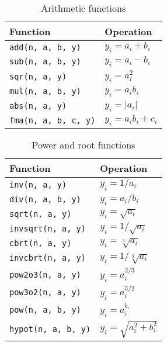 \begin{table}
  \begin{tabularx}{\textwidth}{LL}
    \toprule
    Function & Operation \\
    \midrule
    \verb|add(n, a, b, y)|    & $y_i = a_i + b_i$     \\
    \verb|sub(n, a, b, y)|    & $y_i = a_i - b_i$     \\
    \verb|sqr(n, a, y)|       & $y_i = a_i^2$         \\
    \verb|mul(n, a, b, y)|    & $y_i = a_i b_i$       \\
    \verb|abs(n, a, y)|       & $y_i = |a_i|$         \\
    \verb|fma(n, a, b, c, y)| & $y_i = a_i b_i + c_i$ \\
    \bottomrule
  \end{tabularx}
  \caption{Arithmetic functions}
  \label{tab:Arithmetic functions}
\end{table}

\begin{table}
  \begin{tabularx}{\textwidth}{LL}
    \toprule
    Function & Operation \\
    \midrule
    \verb|inv(n, a, y)|      & $y_i = 1 / a_i$              \\
    \verb|div(n, a, b, y)|   & $y_i = a_i / b_i$            \\
    \verb|sqrt(n, a, y)|     & $y_i = \sqrt{a_i}$           \\
    \verb|invsqrt(n, a, y)|  & $y_i = 1 / \sqrt{a_i}$       \\
    \verb|cbrt(n, a, y)|     & $y_i = \sqrt[3]{a_i}$        \\
    \verb|invcbrt(n, a, y)|  & $y_i = 1 / \sqrt[3]{a_i}$    \\
    \verb|pow2o3(n, a, y)|   & $y_i = a_i^{2/3}$            \\
    \verb|pow3o2(n, a, y)|   & $y_i = a_i^{3/2}$            \\
    \verb|pow(n, a, b, y)|   & $y_i = a_i^{b_i}$            \\
    \verb|hypot(n, a, b, y)| & $y_i = \sqrt{a_i^2 + b_i^2}$ \\
    \bottomrule
  \end{tabularx}
  \caption{Power and root functions}
  \label{tab:Power and root functions}
\end{table}

